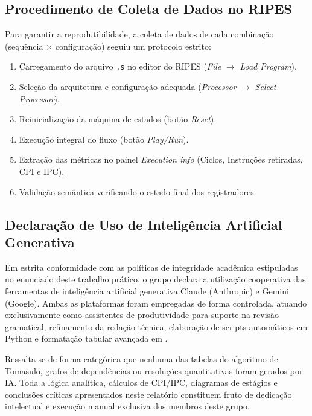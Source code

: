 \documentclass[12pt,a4paper]{article}
\begin{document}
\subsection{Procedimento de Coleta de Dados no RIPES}
Para garantir a reprodutibilidade, a coleta de dados de cada combinação (sequência $\times$ configuração) seguiu um protocolo estrito:
\begin{enumerate}
    \item Carregamento do arquivo \texttt{.s} no editor do RIPES (\textit{File} $\to$ \textit{Load Program}).
    \item Seleção da arquitetura e configuração adequada (\textit{Processor} $\to$ \textit{Select Processor}).
    \item Reinicialização da máquina de estados (botão \textit{Reset}).
    \item Execução integral do fluxo (botão \textit{Play/Run}).
    \item Extração das métricas no painel \textit{Execution info} (Ciclos, Instruções retiradas, CPI e IPC).
    \item Validação semântica verificando o estado final dos registradores.
\end{enumerate}

\subsection{Declaração de Uso de Inteligência Artificial Generativa}
Em estrita conformidade com as políticas de integridade acadêmica estipuladas no enunciado deste trabalho prático, o grupo declara a utilização cooperativa das ferramentas de inteligência artificial generativa Claude (Anthropic) e Gemini (Google). Ambas as plataformas foram empregadas de forma controlada, atuando exclusivamente como assistentes de produtividade para suporte na revisão gramatical, refinamento da redação técnica, elaboração de scripts automáticos em Python e formatação tabular avançada em \text{\LaTeX}. 

Ressalta-se de forma categórica que nenhuma das tabelas do algoritmo de Tomasulo, grafos de dependências ou resoluções quantitativas foram gerados por IA. Toda a lógica analítica, cálculos de CPI/IPC, diagramas de estágios e conclusões críticas apresentados neste relatório constituem fruto de dedicação intelectual e execução manual exclusiva dos membros deste grupo.
\newpage

\end{document}
